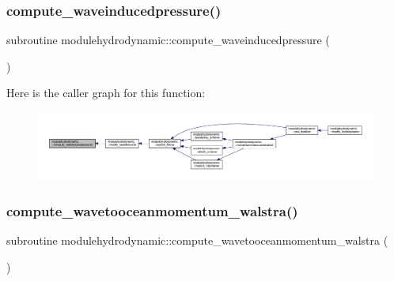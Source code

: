 \subsubsection{\texorpdfstring{compute\+\_\+waveinducedpressure()}{compute\_waveinducedpressure()}}
{\footnotesize\ttfamily subroutine modulehydrodynamic\+::compute\+\_\+waveinducedpressure (\begin{DoxyParamCaption}{ }\end{DoxyParamCaption})\hspace{0.3cm}{\ttfamily [private]}}

Here is the caller graph for this function\+:\nopagebreak
\begin{figure}[H]
\begin{center}
\leavevmode
\includegraphics[width=350pt]{namespacemodulehydrodynamic_a0b29794a32cb2b809209708245963c8c_icgraph}
\end{center}
\end{figure}
\mbox{\label{namespacemodulehydrodynamic_ab36d10de7b5652c6443525b564c85d3b}} 
\subsubsection{\texorpdfstring{compute\+\_\+wavetooceanmomentum\+\_\+walstra()}{compute\_wavetooceanmomentum\_walstra()}}
{\footnotesize\ttfamily subroutine modulehydrodynamic\+::compute\+\_\+wavetooceanmomentum\+\_\+walstra (\begin{DoxyParamCaption}{ }\end{DoxyParamCaption})\hspace{0.3cm}{\ttfamily [private]}}

